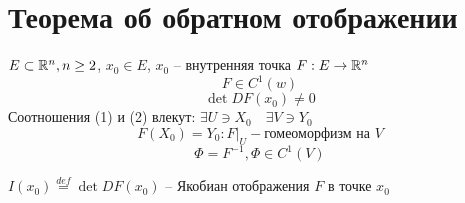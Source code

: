 \documentclass[main]{subfiles}
\begin{document}
\chapter{Теорема об обратном отображении}
    $E \subset {\mathbb{R}}^n, n \geq 2$, $x_0 \in E$, $x_0 $ -- внутренняя точка
    $F: E \rightarrow {\mathbb{R}}^n$
    \[F \in C^{1}(w) \tag{1}\]
    \[ \det DF(x_0) \ne 0 \tag{2}\]
    Соотношения (1) и (2) влекут: $\exists U \ni X_0 \quad \exists V \ni Y_0$
        \[F(X_0) = Y_0:F|_U - \text{гомеоморфизм на } V  \tag{3} \]
        \[ \Phi = F^{-1}, \Phi \in C^1(V) \tag{4}\]
 
        \begin{definition}[Якобиан]
        $I(x_0) \stackrel{def}{=} \det DF(x_0)$ -- Якобиан отображения $F$ в точке $x_0$
        \end{definition}
 
\end{document}
